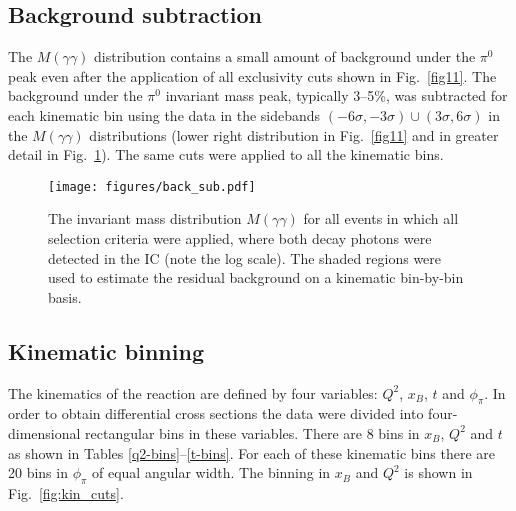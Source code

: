 \documentclass[prc,floatfix,twocolumn,superscriptaddress,letter]{revtex4}
\begin{document}
\subsection{Background subtraction}

The $M(\gamma\gamma)$ distribution contains a small amount of  background under the $\pi^0$ peak even after the application of all exclusivity cuts shown in Fig.~\ref{fig11}.
The background under the $\pi^0$ invariant mass peak, typically 3--5\%, was subtracted for each kinematic bin using the data in the sidebands $(-6\sigma,-3\sigma) \cup  (3\sigma,6\sigma)$ in the $M(\gamma\gamma)$ distributions (lower right distribution in Fig.~\ref{fig11} and  in greater detail in Fig.~\ref{fig:backsub}). The same cuts were applied to all the kinematic bins. 

\begin{figure} 
\centering
\texttt{[image: figures/back\_sub.pdf]}
\caption{The invariant mass distribution $M(\gamma\gamma)$ for all events in which all selection criteria were applied,
where both decay photons were detected in the IC (note the log scale). The shaded regions  were used to estimate the residual background on a kinematic bin-by-bin basis. 
}
\label{fig:backsub} 
\end{figure}




 \subsection{Kinematic binning}

The kinematics of the reaction  are defined by four variables: $Q^2$, $x_B$,  $t$ and $\phi_{\pi}$.
In order to obtain differential cross sections the data were divided into four-dimensional rectangular bins in these variables.
There are 8 bins in $x_B$, $Q^2$ and $t$ as shown 
in Tables \ref{q2-bins}--\ref{t-bins}. For each of these kinematic bins there are 20 bins in $\phi_{\pi}$ of equal angular width.
  The binning in $x_B$ and $Q^2$  is shown in Fig.~\ref{fig:kin_cuts}. 
\end{document}
